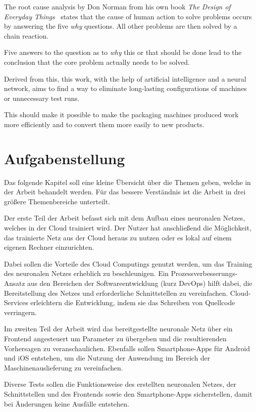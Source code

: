 The root cause analysis by Don Norman from his own book \textit{The Design of Everyday
Things}~\cite{book_einleitung_donnorman} states that the cause of human action to solve problems occurs by answering
the five \textit{why} questions. All other problems are then solved by a chain reaction.

Five answers to the question as to \textit{why} this or that should be done lead to the conclusion that the core
problem actually needs to be solved.

Derived from this, this work, with the help of artificial intelligence and a neural network, aims to find a way to
eliminate long-lasting configurations of machines or unnecessary test runs.

This should make it possible to make the packaging machines produced work more efficiently and to convert them more
easily to new products.

\newpage

\section{Aufgabenstellung}
\label{sec:aufgabenstellung}
Das folgende Kapitel soll eine kleine Übersicht über die Themen geben, welche in der Arbeit behandelt werden. Für das
bessere Verständnis ist die Arbeit in drei größere Themenbereiche unterteilt.

Der erste Teil der Arbeit befasst sich mit dem Aufbau eines neuronalen Netzes, welches in der Cloud trainiert wird. Der
Nutzer hat anschließend die Möglichkeit, das trainierte Netz aus der Cloud heraus zu nutzen oder es lokal auf einem
eigenen Rechner einzurichten.

Dabei sollen die Vorteile des Cloud Computings genutzt werden, um das Training des neuronalen Netzes erheblich zu
beschleunigen. Ein Prozessverbesserungs-Ansatz aus den Bereichen der Softwareentwicklung (kurz DevOps) hilft dabei, die
Bereitstellung des Netzes und erforderliche Schnittstellen zu vereinfachen. Cloud-Services erleichtern die Entwicklung,
indem sie das Schreiben von Quellcode verringern.

Im zweiten Teil der Arbeit wird das bereitgestellte neuronale Netz über ein Frontend angesteuert um Parameter  zu
übergeben und die resultierenden Vorhersagen zu veranschaulichen. Ebenfalls sollen Smartphone-Apps für Android und iOS
entstehen, um die Nutzung der Anwendung im Bereich der Maschinenauslieferung zu vereinfachen.

Diverse Tests sollen die Funktionsweise des erstellten neuronalen Netzes, der Schnittstellen und des Frontends
sowie den Smartphone-Apps sicherstellen, damit bei Änderungen keine Ausfälle entstehen.

